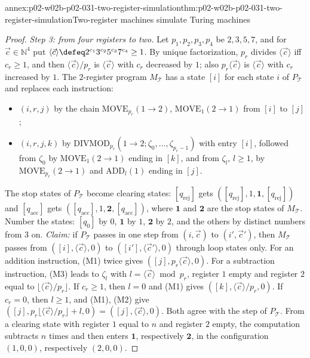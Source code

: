 \begin{annexitem}{annex:p02-w02b-p02-031-two-register-simulation}{thm:p02-w02b-p02-031-two-register-simulation}{Two-register machines simulate Turing machines}
\begin{proof}
\emph{Step 3: from four registers to two.}  Let \(p_1,p_2,p_3,p_4\) be
\(2,3,5,7\), and for \(\vec c\in\mathbb N^{4}\) put \(\langle\vec
c\rangle\defeq2^{c_1}3^{c_2}5^{c_3}7^{c_4}\geq1\).  By unique factorization,
\(p_r\) divides \(\langle\vec c\rangle\) iff \(c_r\geq1\), and then
\(\langle\vec c\rangle/p_r\) is \(\langle\vec c\rangle\) with \(c_r\)
decreased by \(1\); also \(p_r\langle\vec c\rangle\) is \(\langle\vec
c\rangle\) with \(c_r\) increased by \(1\).  The \(2\)-register program
\(M_{\mathcal T}\) has a state \([i]\) for each state \(i\) of
\(P_{\mathcal T}\) and replaces each instruction:
\begin{itemize}
\item \((i,r,j)\) by the chain \(\mathrm{MOVE}_{p_r}(1\to2)\),
      \(\mathrm{MOVE}_1(2\to1)\) from \([i]\) to \([j]\);
\item \((i,r,j,k)\) by \(\mathrm{DIVMOD}_{p_r}(1\to2;\allowbreak\zeta_0,\ldots,
      \zeta_{p_r-1})\) with entry \([i]\), followed from \(\zeta_0\) by
      \(\mathrm{MOVE}_1(2\to1)\) ending in \([k]\), and from \(\zeta_l\),
      \(l\geq1\), by \(\mathrm{MOVE}_{p_r}(2\to1)\) and \(\mathrm{ADD}_l(1)\)
      ending in \([j]\).
\end{itemize}
The stop states of \(P_{\mathcal T}\) become clearing states:
\([q_{\mathrm{rej}}]\) gets \(([q_{\mathrm{rej}}],1,\mathbf 1,
[q_{\mathrm{rej}}])\) and \([q_{\mathrm{acc}}]\) gets
\(([q_{\mathrm{acc}}],1,\mathbf 2,[q_{\mathrm{acc}}])\), where \(\mathbf 1\) and
\(\mathbf 2\) are the stop states of \(M_{\mathcal T}\).  Number the states:
\([q_0]\) by \(0\), \(\mathbf 1\) by \(1\), \(\mathbf 2\) by \(2\), and the
others by distinct numbers from \(3\) on.  \emph{Claim:} if
\(P_{\mathcal T}\) passes in one step from \((i,\vec c)\) to \((i',\vec c')\),
then \(M_{\mathcal T}\) passes from \(([i],\langle\vec c\rangle,0)\) to
\(([i'],\langle\vec c'\rangle,0)\) through loop states only.  For an addition
instruction, (M1) twice gives \(([j],p_r\langle\vec c\rangle,0)\).  For a
subtraction instruction, (M3) leads to \(\zeta_l\) with
\(l=\langle\vec c\rangle\bmod p_r\), register \(1\) empty and register \(2\)
equal to \(\lfloor\langle\vec c\rangle/p_r\rfloor\).  If \(c_r\geq1\), then
\(l=0\) and (M1) gives \(([k],\langle\vec c\rangle/p_r,0)\).  If \(c_r=0\),
then \(l\geq1\), and (M1), (M2) give \(([j],p_r\lfloor\langle\vec
c\rangle/p_r\rfloor+l,0)=([j],\langle\vec c\rangle,0)\).  Both agree with the
step of \(P_{\mathcal T}\).  From a clearing state with register \(1\) equal to
\(n\) and register \(2\) empty, the computation subtracts \(n\) times and then
enters \(\mathbf 1\), respectively \(\mathbf 2\), in the configuration
\((1,0,0)\), respectively \((2,0,0)\).


\end{proof}
\end{annexitem}
